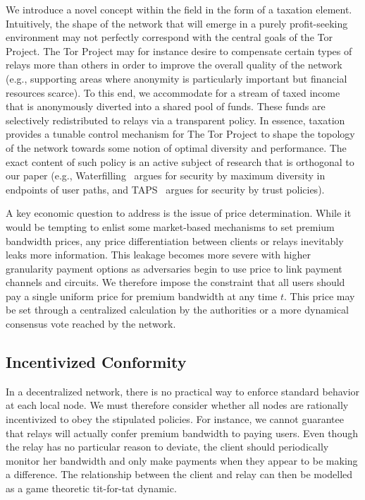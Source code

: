 We introduce a novel concept within the field in the form of a taxation
element. Intuitively, the shape of the network that will emerge in a purely
profit-seeking environment may not perfectly correspond with the central goals
of the Tor Project. The Tor Project may for instance desire to compensate
certain types of relays more than others in order to improve the overall quality
of the network (e.g., supporting areas where anonymity is particularly important
but financial resources scarce). To this end, we accommodate for a stream of
taxed income that is anonymously diverted into a shared pool of funds. These
funds are selectively redistributed to relays via a transparent policy.  In
essence, taxation provides a tunable control mechanism for The Tor Project to
shape the topology of the network towards some notion of optimal diversity and
performance. The exact content of such policy is an active subject of research
that is orthogonal to our paper (e.g., Waterfilling~\cite{waterfilling-pets2017}
argues for security by maximum diversity in endpoints of user paths, and
TAPS~\cite{taps-ndss2017} argues for security by trust policies).

A key economic question to address is the issue of price determination. While it
would be tempting to enlist some market-based mechanisms to set premium
bandwidth prices, any price differentiation between clients or relays inevitably
leaks more information. This leakage becomes more severe with higher granularity
payment options as adversaries begin to use price to link payment channels and
circuits. We therefore impose the constraint that all users should pay a single
uniform price for premium bandwidth at any time $t$. This price may be set
through a centralized calculation by the authorities or a more dynamical
consensus vote reached by the network.
\subsection{Incentivized Conformity} In a decentralized network, there is no
practical way to enforce standard behavior at each local node. We must therefore
consider whether all nodes are rationally incentivized to obey the stipulated
policies. For instance, we cannot guarantee that relays will actually confer
premium bandwidth to paying users. Even though the relay has no particular
reason to deviate, the client should periodically monitor her bandwidth and only
make payments when they appear to be making a difference. The relationship
between the client and relay can then be modelled as a game theoretic tit-for-tat
dynamic.

